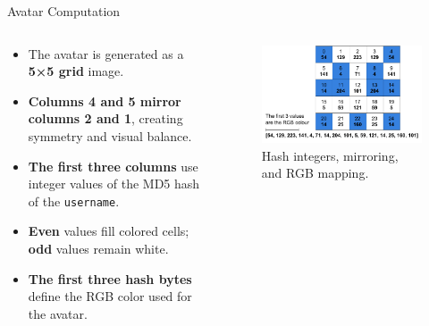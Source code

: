 \documentclass[aspectratio=169, table]{beamer}
\begin{document}
\begin{frame}[fragile]{Avatar Computation}
\begin{columns}[T,totalwidth=\textwidth]
  \begin{column}{0.4\textwidth}
    \small
    \begin{itemize}
      \item The avatar is generated as a \textbf{5×5 grid} image.
      \item \textbf{Columns 4 and 5 mirror columns 2 and 1}, creating symmetry and visual balance.
      \item \textbf{The first three columns} use integer values of the MD5 hash of the \texttt{username}.
      \item \textbf{Even} values fill colored cells; \textbf{odd} values remain white.
      \item \textbf{The first three hash bytes} define the RGB color used for the avatar.
    \end{itemize}
  \end{column}
\hfill
  \begin{column}{0.6\textwidth}
    \centering
    \begin{figure}
      \includegraphics[width=\linewidth]{../../assets/avatar-computation.pdf}
      \caption{Hash integers, mirroring, and RGB mapping.}
    \end{figure}
  \end{column}
\end{columns}
\end{frame}
\end{document}
